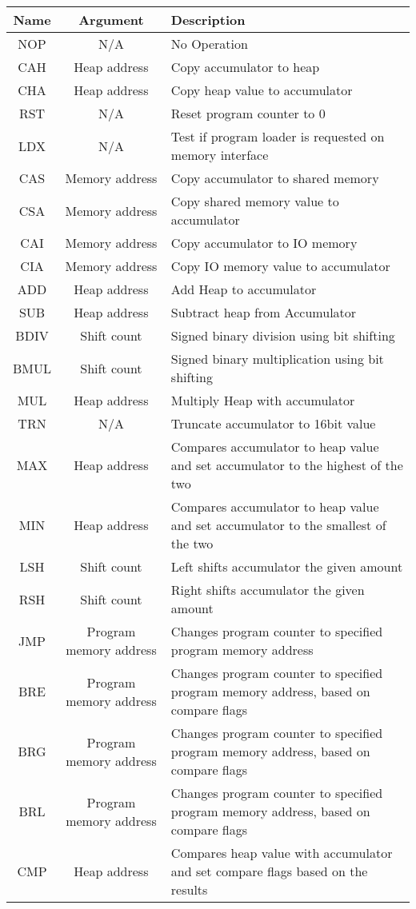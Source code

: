 \begin{tabular}{c|c|p{8cm}}
	\textbf{Name} & \textbf{Argument} & \textbf{Description} \\ \hline
	NOP & N/A & No Operation \\ 
	CAH & Heap address & Copy accumulator to heap\\ 
	CHA & Heap address & Copy heap value to accumulator\\ 
	RST & N/A & Reset program counter to 0 \\ 
	LDX & N/A & Test if program loader is requested on memory interface\\ 
	CAS & Memory address & Copy accumulator to shared memory \\ 
	CSA & Memory address & Copy shared memory value to accumulator \\ 
	CAI & Memory address & Copy accumulator to IO memory\\ 
	CIA & Memory address & Copy IO memory value to accumulator\\ 
	ADD & Heap address & Add Heap to accumulator \\ 
	SUB & Heap address & Subtract heap from Accumulator\\ 
	BDIV & Shift count & Signed binary division using bit shifting\\ 
	BMUL & Shift count & Signed binary multiplication using bit shifting\\ 
	MUL & Heap address & Multiply Heap with accumulator\\ 
	TRN & N/A & Truncate accumulator to 16bit value\\ 
	MAX & Heap address & Compares accumulator to heap value and set accumulator to the highest of the two\\ 
	MIN & Heap address & Compares accumulator to heap value and set accumulator to the smallest of the two\\ 
	LSH & Shift count & Left shifts accumulator the given amount\\ 
	RSH & Shift count & Right shifts accumulator the given amount\\ 
	JMP & Program memory address & Changes program counter to specified program memory address\\ 
	BRE & Program memory address & Changes program counter to specified program memory address, based on compare flags\\ 
	BRG & Program memory address & Changes program counter to specified program memory address, based on compare flags\\ 
	BRL & Program memory address & Changes program counter to specified program memory address, based on compare flags \\ 
	CMP & Heap address & Compares heap value with accumulator and set compare flags based on the results\\ 
\end{tabular}